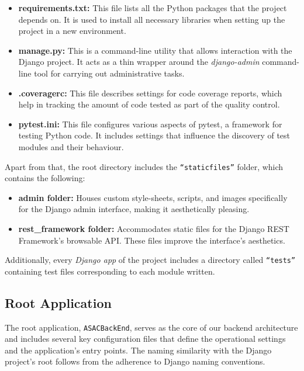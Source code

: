 \begin{itemize}
    \item \textbf{requirements.txt:} This file lists all the Python packages that the project depends on. It is used to install all necessary libraries when setting up the project in a new environment.
    \item \textbf{manage.py:} This is a command-line utility that allows interaction with the Django project. It acts as a thin wrapper around the \textit{django-admin} command-line tool for carrying out administrative tasks.
    \item \textbf{.coveragerc:} This file describes settings for code coverage reports, which help in tracking the amount of code tested as part of the quality control. 
    \item \textbf{pytest.ini:} This file configures various aspects of pytest, a framework for testing Python code. It includes settings that influence the discovery of test modules and their behaviour.
\end{itemize}

Apart from that, the root directory includes the \texttt{``staticfiles''} folder, which contains the following:

\begin{itemize}
    \item \textbf{admin folder:} Houses custom style-sheets, scripts, and images specifically for the Django admin interface, making it aesthetically pleasing.
    \item \textbf{rest\_framework folder:} Accommodates static files for the Django REST Framework's browsable API. These files improve the interface's aesthetics.
\end{itemize}

Additionally, every \textit{Django app} of the project includes a directory called \texttt{``tests''} containing test files corresponding to each module written.

\subsection{Root Application}

The root application, \texttt{ASACBackEnd}, serves as the core of our backend architecture and includes several key configuration files that define the operational settings and the application's entry points. The naming similarity with the Django project's root follows from the adherence to Django naming conventions.

